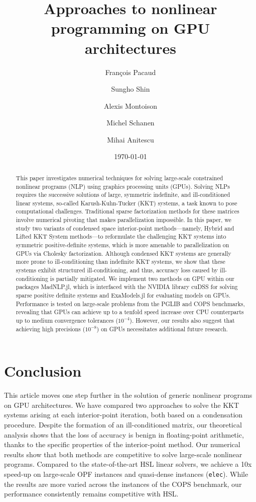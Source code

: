 \documentclass[smallextended]{svjour3}
\title{Approaches to nonlinear programming on GPU architectures}
\author{François Pacaud \and
Sungho Shin \and
Alexis Montoison \and
Michel Schanen \and
Mihai Anitescu
}
\date{\today}
\begin{document}
\maketitle

\begin{abstract}
  This paper investigates numerical techniques for solving large-scale constrained nonlinear programs (NLP) using graphics processing units (GPUs).
  Solving NLPs requires the successive solutions of large, symmetric indefinite, and ill-conditioned linear systems, so-called Karush-Kuhn-Tucker (KKT) systems, a task known to pose computational challenges.
  Traditional sparse factorization methods for these matrices involve numerical pivoting that makes parallelization impossible.
  In this paper, we study two variants of condensed space interior-point methods---namely, Hybrid and Lifted KKT System methods---to reformulate the challenging KKT systems into symmetric positive-definite systems, which is more amenable to parallelization on GPUs via Cholesky factorization.
  Although condensed KKT systems are generally more prone to ill-conditioning than indefinite KKT systems, we show that these systems exhibit structured ill-conditioning, and thus, accuracy loss caused by ill-conditioning is partially mitigated.
  We implement two methods on GPU within our packages MadNLP.jl, which is interfaced with the NVIDIA library cuDSS for solving sparse positive definite systems and ExaModels.jl for evaluating models on GPUs.
  Performance is tested on large-scale problems from the PGLIB and COPS benchmarks, revealing that GPUs can achieve up to a tenfold speed increase over CPU counterparts up to medium convergence tolerances ($10^{-4}$).
  However, our results also suggest that achieving high precisions ($10^{-8}$) on GPUs necessitates additional future research.
\end{abstract}










\section{Conclusion}
This article moves one step further in the solution of generic nonlinear
programs on GPU architectures. We have compared two approaches
to solve the KKT systems arising at each interior-point iteration, both
based on a condensation procedure.
Despite the formation of an ill-conditioned matrix, our theoretical analysis shows that the loss of accuracy is benign in floating-point arithmetic, thanks to the specific properties of the interior-point method.
Our numerical results show that both methods are competitive to solve large-scale
nonlinear programs.
Compared to the state-of-the-art HSL linear solvers, we achieve a 10x speed-up on large-scale OPF instances and quasi-dense instances (\texttt{elec}). While the results are more varied across the instances of the COPS benchmark, our performance consistently remains competitive with HSL.
\end{document}
